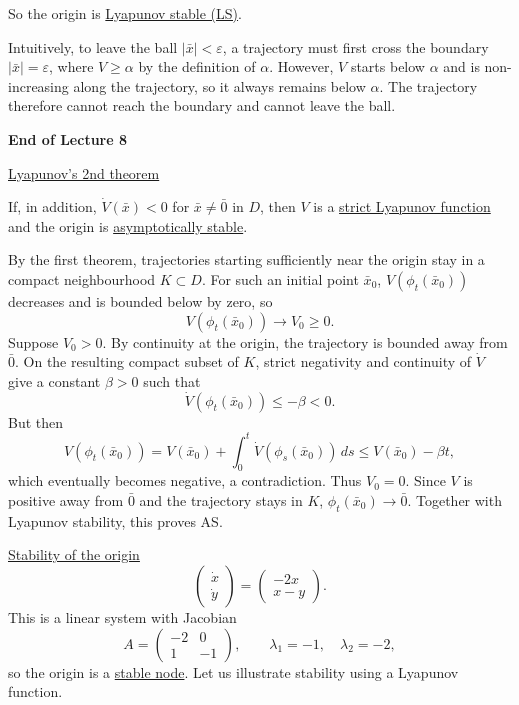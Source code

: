 \documentclass[11pt,a4paper]{article}
\begin{document}
\medskip
\noindent So the origin is \underline{Lyapunov stable (LS)}.

\medskip
\noindent
Intuitively, to leave the ball $|\bar x|<\varepsilon$, a trajectory must first
cross the boundary $|\bar x|=\varepsilon$, where $V\geq\alpha$ by the definition
of $\alpha$. However, $V$ starts below $\alpha$ and is non-increasing along
the trajectory, so it always remains below $\alpha$. The trajectory therefore
cannot reach the boundary and cannot leave the ball.

\begin{center}
\textbf{End of Lecture 8}
\end{center}

\newpage
\noindent{}\quad\underline{Lyapunov's 2nd theorem}

\medskip
\noindent
If, in addition, $\dot V(\bar x)<0$ for $\bar x\neq\bar0$ in $D$, then $V$ is a
\underline{strict Lyapunov function} and the origin is \underline{asymptotically stable}.

\medskip
\noindent{}\quad
By the first theorem, trajectories starting sufficiently near the origin stay
in a compact neighbourhood $K\subset D$. For such an initial point $\bar x_0$,
$V(\phi_t(\bar x_0))$ decreases and is bounded below by zero, so
\[
V(\phi_t(\bar x_0))\longrightarrow V_0\geq0.
\]
Suppose $V_0>0$. By continuity at the origin, the trajectory is bounded away
from $\bar0$. On the resulting compact subset of $K$, strict negativity and
continuity of $\dot V$ give a constant $\beta>0$ such that
\[
\dot V(\phi_t(\bar x_0))\leq-\beta<0.
\]
But then
\[
V(\phi_t(\bar x_0))
=V(\bar x_0)+\int_0^t\dot V(\phi_s(\bar x_0))\,ds
\leq V(\bar x_0)-\beta t,
\]
which eventually becomes negative, a contradiction. Thus $V_0=0$.
Since $V$ is positive away from $\bar0$ and the trajectory stays in $K$,
$\phi_t(\bar x_0)\to\bar0$. Together with Lyapunov stability, this proves AS.

\medskip
\noindent{}\quad\underline{Stability of the origin}
\[
\begin{pmatrix}\dot x\\\dot y\end{pmatrix}
=\begin{pmatrix}-2x\\x-y\end{pmatrix}.
\]
This is a linear system with Jacobian
\[
A=\begin{pmatrix}-2&0\\1&-1\end{pmatrix},
\qquad \lambda_1=-1,\quad\lambda_2=-2,
\]
so the origin is a \underline{stable node}. Let us illustrate stability using
a Lyapunov function.
\end{document}
